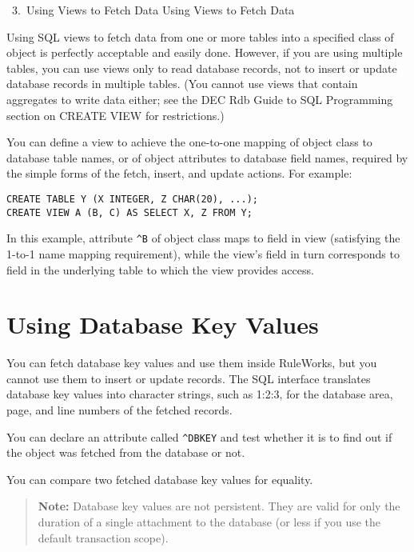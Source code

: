        3. Using Views to Fetch Data Using Views to
          Fetch Data

     Using SQL views to fetch data from one or more
     tables into a specified class of object is
     perfectly acceptable and easily done. However,
     if you are using multiple tables, you can use
     views only to read database records, not to
     insert or update database records in multiple
     tables. (You cannot use views that contain
     aggregates to write data either; see the DEC
     Rdb Guide to SQL Programming section on CREATE
     VIEW for restrictions.)

     You can define a view to achieve the
     one-to-one mapping of object class to database
     table names, or of object attributes to
     database field names, required by the simple
     forms of the fetch, insert, and update
     actions. For example:

\begin{exampl}
\begin{verbatim}
CREATE TABLE Y (X INTEGER, Z CHAR(20), ...);
CREATE VIEW A (B, C) AS SELECT X, Z FROM Y;
\end{verbatim}

  In this example, attribute \verb|^B| of object class  maps to
  field  in view  (satisfying the 1-to-1 name mapping
  requirement), while the view's field  in turn corresponds to
  field  in the underlying table  to which the view
  provides access.
\end{exampl}
   
\section{Using Database Key Values}

You can fetch database key values and use them inside RuleWorks, but
you cannot use them to insert or update records. The SQL interface
translates database key values into character strings, such as 1:2:3,
for the database area, page, and line numbers of the fetched records.

You can declare an attribute called \verb|^DBKEY| and test whether it
is  to find out if the object was fetched from the database or
not.

You can compare two fetched database key values for equality.

\begin{quote}
  \textbf{Note:} Database key values are not persistent.  They are
  valid for only the duration of a single attachment to the database
  (or less if you use the default transaction scope).
\end{quote}

